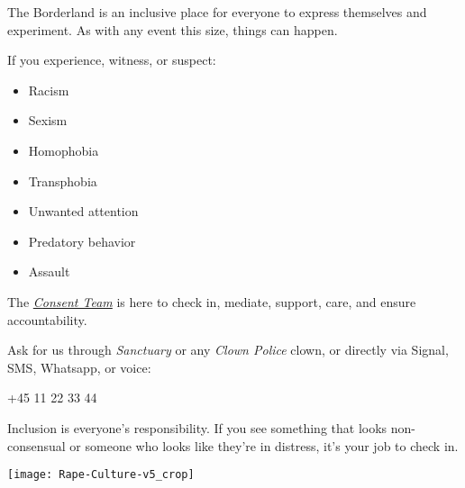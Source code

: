 \documentclass[a4paper,english,12pt]{article}
\begin{document}
\begin{figure*}[!b]
  \centering
  \begin{minipage}{.5\textwidth}
    The Borderland is an inclusive place for everyone to express themselves and experiment. As with any event this size, things can happen.

    If you experience, witness, or suspect:

    \begin{itemize}
      \item Racism
      \item Sexism
      \item Homophobia
      \item Transphobia
      \item Unwanted attention
      \item Predatory behavior
      \item Assault %
    \end{itemize}

    The \emph{\underline{Consent Team}} is here to check in, mediate, support, care, and ensure accountability.

    Ask for us through \emph{Sanctuary} or any \emph{Clown Police} clown, or directly via Signal, SMS, Whatsapp, or voice:

    \begin{center}
      \Large{+45 11 22 33 44}
    \end{center}

    Inclusion is everyone's responsibility. If you see something that looks non-consensual or someone who looks like they're in distress, it's your job to check in.
  \end{minipage}
  \begin{minipage}{.49\textwidth}
    \texttt{[image: Rape-Culture-v5\_crop]}
  \end{minipage}
\end{figure*}










\end{document}
